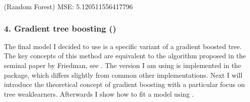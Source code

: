 \documentclass[letterpaper,10pt,english]{sphinxmanual}
\begin{document}
\begin{sphinxVerbatim}[commandchars=\\\{\}]
  \PYG{p}{[}\PYG{p}{]}
  \PYG{p}{[}\PYG{p}{]}

  
 

  
   
\end{sphinxVerbatim}

\begin{sphinxVerbatim}[commandchars=\\\{\}]
(Random Forest) MSE: 5.120511556417796
\end{sphinxVerbatim}


\subsubsection{4. Gradient tree boosting ()}
\label{\detokenize{simulated_final:gradient-tree-boosting-the-final-model}}
The final model I decided to use is a specific variant of a gradient boosted tree. The key concepts of this method are equivalent to the algorithm proposed in the seminal paper by Friedman, see . The version I am using is implemented in the  package, which differs slightly from common other implementations. Next I will introduce the theoretical concept of gradient boosting with a particular focus on tree weak\sphinxhyphen{}learners. Afterwards I show how to fit a model using .
\end{document}
